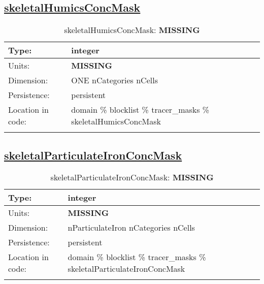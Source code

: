 \subsection[skeletalHumicsConcMask]{\hyperref[sec:var_tab_tracer_masks]{skeletalHumicsConcMask}}
\label{subsec:var_sec_tracer_masks_skeletalHumicsConcMask}
\begin{center}
\begin{longtable}{| p{2.0in} | p{4.0in} |}
        \hline 
        Type: & integer \\
        \hline 
        Units: & {\bf \color{red} MISSING} \\
        \hline 
        Dimension: & ONE nCategories nCells \\
        \hline 
        Persistence: & persistent \\
        \hline 
         Location in code: & domain \% blocklist \% tracer\_masks \% skeletalHumicsConcMask \\
         \hline 
    \caption{skeletalHumicsConcMask: {\bf \color{red} MISSING}}
\end{longtable}
\end{center}
\subsection[skeletalParticulateIronConcMask]{\hyperref[sec:var_tab_tracer_masks]{skeletalParticulateIronConcMask}}
\label{subsec:var_sec_tracer_masks_skeletalParticulateIronConcMask}
\begin{center}
\begin{longtable}{| p{2.0in} | p{4.0in} |}
        \hline 
        Type: & integer \\
        \hline 
        Units: & {\bf \color{red} MISSING} \\
        \hline 
        Dimension: & nParticulateIron nCategories nCells \\
        \hline 
        Persistence: & persistent \\
        \hline 
         Location in code: & domain \% blocklist \% tracer\_masks \% skeletalParticulateIronConcMask \\
         \hline 
    \caption{skeletalParticulateIronConcMask: {\bf \color{red} MISSING}}
\end{longtable}
\end{center}
